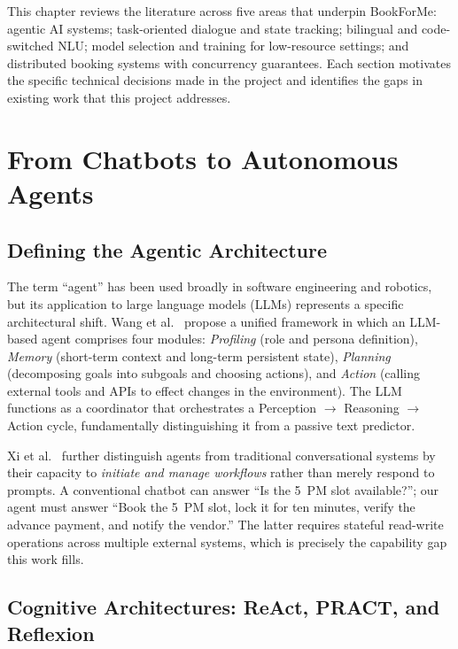 This chapter reviews the literature across five areas that underpin BookForMe:
agentic AI systems; task-oriented dialogue and state tracking; bilingual and
code-switched NLU; model selection and training for low-resource settings; and
distributed booking systems with concurrency guarantees. Each section motivates
the specific technical decisions made in the project and identifies the gaps in
existing work that this project addresses.

\section{From Chatbots to Autonomous Agents}
\label{sec:lit-agents}

\subsection{Defining the Agentic Architecture}

The term ``agent'' has been used broadly in software engineering and robotics,
but its application to large language models (LLMs) represents a specific
architectural shift. Wang et al.~\cite{wang2024} propose a unified framework in
which an LLM-based agent comprises four modules: \textit{Profiling} (role and
persona definition), \textit{Memory} (short-term context and long-term
persistent state), \textit{Planning} (decomposing goals into subgoals and
choosing actions), and \textit{Action} (calling external tools and APIs to
effect changes in the environment). The LLM functions as a coordinator that
orchestrates a Perception $\rightarrow$ Reasoning $\rightarrow$ Action cycle,
fundamentally distinguishing it from a passive text predictor.

Xi et al.~\cite{xi2023} further distinguish agents from traditional
conversational systems by their capacity to \textit{initiate and manage
workflows} rather than merely respond to prompts. A conventional chatbot can
answer ``Is the 5~PM slot available?''; our agent must answer ``Book the 5~PM
slot, lock it for ten minutes, verify the advance payment, and notify the
vendor.'' The latter requires stateful read-write operations across multiple
external systems, which is precisely the capability gap this work fills.

\subsection{Cognitive Architectures: ReAct, PRACT, and Reflexion}

